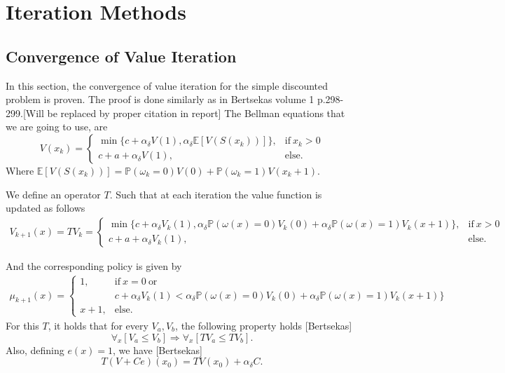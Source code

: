 

\chapter{Iteration Methods}
\section{Convergence of Value Iteration}
In this section, the convergence of value iteration for the simple discounted problem is proven.
The proof is done similarly as in Bertsekas volume 1 p.298-299.[Will be replaced by proper citation in report]
The Bellman equations that we are going to use, are
\begin{equation}
V(x_k)=\begin{cases}
\min\{c+\alpha_\delta V(1),\alpha_\delta \mathbb{E}[V(S(x_k))]\},&\text{if}\ x_k>0 \\
c+a+\alpha_\delta V(1),&\text{else.}
\end{cases}
\end{equation}
Where $\mathbb{E}[V(S(x_k))]=\mathbb{P}(\omega_k=0)V(0)+\mathbb{P}(\omega_k=1)V(x_k+1)$.

We define an operator $T$. Such that at each iteration the value function is updated as follows
\begin{equation}
\begin{split}
V_{k+1}(x)=TV_k=\begin{cases}
\min\{c+\alpha_\delta V_k(1),\alpha_\delta\mathbb{P}(\omega(x)=0)V_k(0)+\alpha_\delta\mathbb{P}(\omega(x)=1)V_k(x+1)\},&\text{if}\ x>0 \\
c+a+\alpha_\delta V_k(1),&\text{else.}
\end{cases}
\end{split}
\end{equation}

And the corresponding policy is given by
\begin{equation}
\begin{split}
\mu_{k+1}(x)=\begin{cases}
1,&\text{if}\ x=0\ \text{or}\\&c+\alpha_\delta V_k(1)<\alpha_\delta\mathbb{P}(\omega(x)=0)V_k(0)+\alpha_\delta\mathbb{P}(\omega(x)=1)V_k(x+1)\} \\
x+1,&\text{else.}
\end{cases}
\end{split}
\end{equation}
For this $T$, it holds that for every $V_a,V_b$, the following property holds [Bertsekas]
$$
\forall_x [V_a\leq V_b]\Rightarrow \forall_x [TV_a\leq TV_b].
$$
Also, defining $e(x)=1$, we have [Bertsekas]
$$
T(V+Ce)(x_0) = TV(x_0)+\alpha_\delta C.
$$

